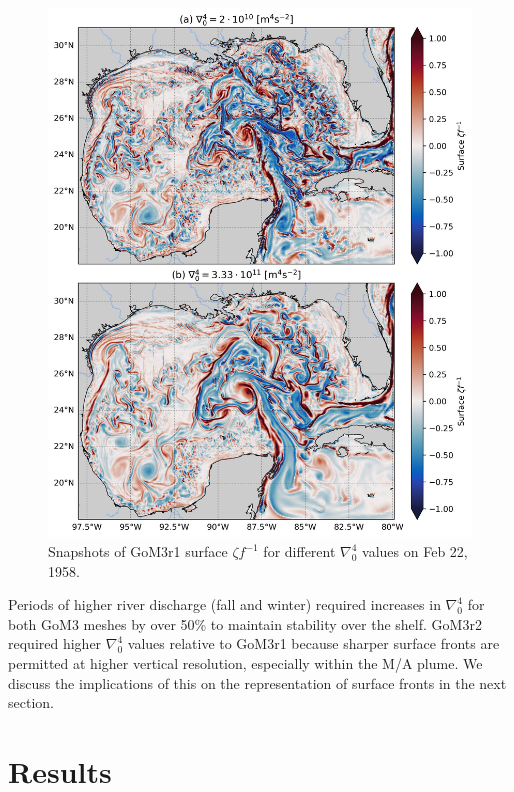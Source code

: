 \begin{figure} \centerline{\includegraphics[width=\textwidth]{figures/scgsr/rvort_del4_comp.jpg}}
    \caption{Snapshots of GoM3r1 surface $\zeta f^{-1}$ for different $\nabla_0^4$ values on Feb 22, 1958.}
    \label{fig:del4}
\end{figure}

Periods of higher river discharge (fall and winter) required increases in $\nabla_0^4$ for both GoM3 meshes by over 50\% to maintain stability over the shelf. GoM3r2 required higher $\nabla_0^4$ values relative to GoM3r1 because sharper surface fronts are permitted at higher vertical resolution, especially within the M/A plume. We discuss the implications of this on the representation of surface fronts in the next section. 

\section{Results}
